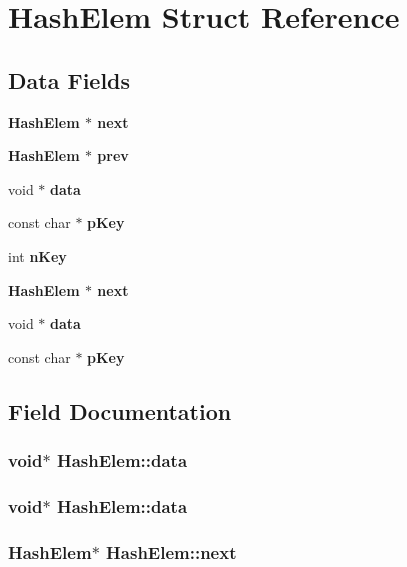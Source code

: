 \section{Hash\-Elem Struct Reference}
\label{structHashElem}
\subsection*{Data Fields}
\begin{CompactItemize}
\item 
\bf{Hash\-Elem} $\ast$ \bf{next}
\item 
\bf{Hash\-Elem} $\ast$ \bf{prev}
\item 
void $\ast$ \bf{data}
\item 
const char $\ast$ \bf{p\-Key}
\item 
int \bf{n\-Key}
\item 
\bf{Hash\-Elem} $\ast$ \bf{next}
\item 
void $\ast$ \bf{data}
\item 
const char $\ast$ \bf{p\-Key}
\end{CompactItemize}


\subsection{Field Documentation}
\subsubsection{\setlength{\rightskip}{0pt plus 5cm}void$\ast$ \bf{Hash\-Elem::data}}\label{structHashElem_447e754c494eb9a9af63bd57e6ee5def}


\subsubsection{\setlength{\rightskip}{0pt plus 5cm}void$\ast$ \bf{Hash\-Elem::data}}\label{structHashElem_447e754c494eb9a9af63bd57e6ee5def}


\subsubsection{\setlength{\rightskip}{0pt plus 5cm}\bf{Hash\-Elem}$\ast$ \bf{Hash\-Elem::next}}\label{structHashElem_a528f2cc3194e444a06a642f7718dc6a}


